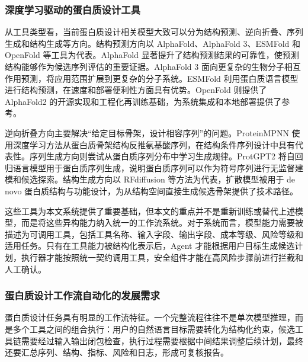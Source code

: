 \subsubsection{深度学习驱动的蛋白质设计工具}\label{ux6df1ux5ea6ux5b66ux4e60ux9a71ux52a8ux7684ux86cbux767dux8d28ux8bbeux8ba1ux5de5ux5177}

从工具类型看，当前蛋白质设计相关模型大致可以分为结构预测、逆向折叠、序列生成和结构生成等方向。结构预测方向以
AlphaFold、AlphaFold 3、ESMFold 和 OpenFold 等工具为代表。AlphaFold
显著提升了结构预测结果的可靠性，使预测结构能够作为候选序列评估的重要证据\citep{jumper2021alphafold}。AlphaFold
3
面向更复杂的生物分子相互作用预测，将应用范围扩展到更复杂的分子系统\citep{abramson2024alphafold3}。ESMFold
利用蛋白质语言模型进行结构预测，在速度和部署便利性方面具有优势\citep{lin2023esmfold}。OpenFold
则提供了 AlphaFold2
的开源实现和工程化再训练基础，为系统集成和本地部署提供了参考\citep{ahdritz2024openfold}。

逆向折叠方向主要解决``给定目标骨架，设计相容序列''的问题。ProteinMPNN
使用深度学习方法从蛋白质骨架结构反推氨基酸序列，在结构条件序列设计中具有代表性\citep{dauparas2022proteinmpnn}。序列生成方向则尝试从蛋白质序列分布中学习生成规律。ProtGPT2
将自回归语言模型用于蛋白质序列生成，说明蛋白质序列可以作为符号序列进行无监督建模和候选探索\citep{ferruz2022protgpt2}。结构生成方向以
RFdiffusion 等方法为代表，扩散模型被用于 de novo
蛋白质结构与功能设计，为从结构空间直接生成候选骨架提供了技术路径\citep{watson2023rfdiffusion}。

这些工具为本文系统提供了重要基础，但本文的重点并不是重新训练或替代上述模型，而是将这些异构能力纳入统一的工作流系统。对于系统而言，模型能力需要被描述为可调用工具，包括工具名称、输入字段、输出字段、成本等级、风险等级和适用任务。只有在工具能力被结构化表示后，Agent
才能根据用户目标生成候选计划，执行器才能按照统一契约调用工具，安全组件才能在高风险步骤前进行拦截和人工确认。

\subsubsection{蛋白质设计工作流自动化的发展需求}\label{ux86cbux767dux8d28ux8bbeux8ba1ux5de5ux4f5cux6d41ux81eaux52a8ux5316ux7684ux53d1ux5c55ux9700ux6c42}

蛋白质设计任务具有明显的工作流特征。一个完整流程往往不是单次模型推理，而是多个工具之间的组合执行：用户的自然语言目标需要转化为结构化约束，候选工具链需要经过输入输出闭包检查，执行过程需要根据中间结果调整后续计划，最终还要汇总序列、结构、指标、风险和日志，形成可复核报告。

